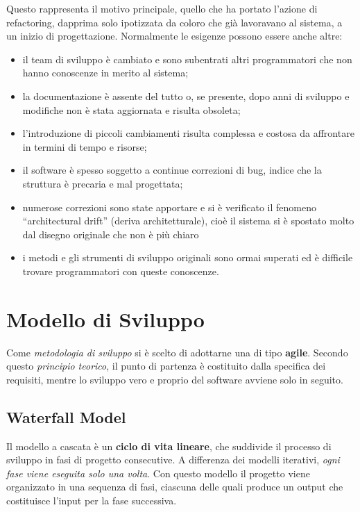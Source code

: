 Questo rappresenta il motivo principale, quello che ha portato l'azione di refactoring, dapprima solo ipotizzata da coloro che già lavoravano al sistema, a un inizio di progettazione. Normalmente le esigenze possono essere anche altre:

\begin{itemize}
    \item il team di sviluppo è cambiato e sono subentrati altri programmatori che non hanno conoscenze in merito al sistema;
    \item la documentazione è assente del tutto o, se presente, dopo anni di sviluppo e modifiche non è stata aggiornata e risulta obsoleta;
    \item  l'introduzione di piccoli cambiamenti risulta complessa e costosa da affrontare in termini di tempo e risorse;
    \item il software è spesso soggetto a continue correzioni di bug, indice che la struttura è precaria e mal progettata;
    \item numerose correzioni sono state apportare e si è verificato il fenomeno ``architectural drift'' (deriva architetturale), cioè il sistema si è spostato molto dal disegno originale che non è più chiaro
    \item i metodi e gli strumenti di sviluppo originali sono ormai superati ed è difficile trovare programmatori con queste conoscenze.
\end{itemize}

\section{Modello di Sviluppo}
Come \textit{metodologia di sviluppo} si è scelto di adottarne una di tipo \textbf{agile}. Secondo questo \emph{principio teorico}, il punto di partenza è costituito dalla specifica dei requisiti, mentre lo sviluppo vero e proprio del software avviene solo in seguito.

\subsection{Waterfall Model}
Il modello a cascata è un \textbf{ciclo di vita lineare}, che suddivide il processo di sviluppo in fasi di progetto consecutive. A differenza dei modelli iterativi, \textit{ogni fase viene eseguita solo una volta}. Con questo modello il progetto viene organizzato in una sequenza di fasi, ciascuna delle quali produce un output che costituisce l’input per la fase successiva.

